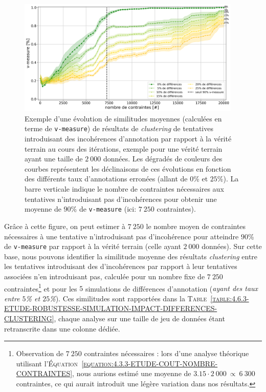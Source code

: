 			\begin{figure}[!htb]
				\centering
				\includegraphics[width=0.95\textwidth]{figures/etude-erreur-simulation-impact-size-2000}
				\caption{
					Exemple d'une évolution de similitudes moyennes (calculées en terme de \texttt{v-measure}) de résultats de \textit{clustering} de tentatives introduisant des incohérences d'annotation par rapport à la vérité terrain au cours des itérations, exemple pour une vérité terrain ayant une taille de $2~000$ données.
					Les dégradés de couleurs des courbes représentent les déclinaisons de ces évolutions en fonction des différents taux d'annotations erronées (allant de $0$\% et $25$\%).
					La barre verticale indique le nombre de contraintes nécessaires aux tentatives n'introduisant pas d'incohérences pour obtenir une moyenne de $90$\% de \texttt{v-measure} (ici: $7~250$ contraintes).
				}
				\label{figure:4.6.3-ETUDE-ROBUSTESSE-SIMULATION-IMPACT-DIFFERENCES-2000}
			\end{figure}
			
			Grâce à cette figure, on peut estimer à $7~250$ le nombre moyen de contraintes nécessaires à une tentative n'introduisant pas d'incohérence pour atteindre $90$\% de \texttt{v-measure} par rapport à la vérité terrain (celle ayant $2~000$ données).
			Sur cette base, nous pouvons identifier la similitude moyenne des résultats \textit{clustering} entre les tentatives introduisant des d'incohérences par rapport à leur tentatives associées n'en introduisant pas, calculée pour un nombre fixe de $7~250$ contraintes\footnote{
				Observation de $7~250$ contraintes nécessaires : lors d'une analyse théorique utilisant l'\textsc{Équation~\ref{equation:4.3.3-ETUDE-COUT-NOMBRE-CONTRAINTES}}, nous aurions estimé une moyenne de $3.15 \cdot 2~000~\propto~6~300$ contraintes, ce qui aurait introduit une légère variation dans nos résultats.
			} et pour les $5$ simulations de différences d'annotation (\textit{ayant des taux entre $5$\% et $25$\%}).
			Ces similitudes sont rapportées dans la \textsc{Table~\ref{table:4.6.3-ETUDE-ROBUSTESSE-SIMULATION-IMPACT-DIFFERENCES-CLUSTERING}}, chaque analyse sur une taille de jeu de données étant retranscrite dans une colonne dédiée.
			
